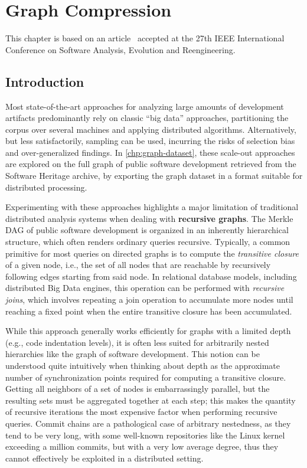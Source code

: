 \chapter{Graph Compression}%
\label{chp:graph-compression}

This chapter is based on an article~\cite{saner-2020-swh-graph} accepted at the
27th IEEE International Conference on Software Analysis, Evolution and
Reengineering.

\section{Introduction}%
\label{sec:compression-intro}

Most state-of-the-art approaches for analyzing large amounts of development
artifacts predominantly rely on classic ``big data'' approaches, partitioning the
corpus over several machines and applying distributed algorithms.
Alternatively, but less satisfactorily, sampling can be used, incurring the
risks of selection bias and over-generalized findings.
In \cref{chp:graph-dataset}, these scale-out approaches are explored on
the full graph of public software development retrieved from the Software
Heritage archive, by exporting the graph dataset in a format suitable for
distributed processing.

Experimenting with these approaches highlights a major limitation of
traditional distributed analysis systems when dealing with \textbf{recursive
graphs}. The Merkle \gls{DAG} of public software development is organized in an
inherently hierarchical structure, which often renders ordinary queries
recursive.
Typically, a common primitive for most queries on directed graphs is to
compute the \emph{transitive closure} of a given node, i.e., the set of all
nodes that are reachable by recursively following edges starting from said
node. In relational database models, including distributed Big Data engines,
this operation can be performed with \emph{recursive joins}, which involves
repeating a join operation to accumulate more nodes until reaching a fixed
point when the entire transitive closure has been accumulated.

While this approach generally works efficiently for graphs with a limited depth
(e.g., code indentation levels), it is often less suited for arbitrarily nested
hierarchies like the graph of software development.
This notion can be understood quite intuitively when thinking about depth as
the approximate number of synchronization points required for computing a
transitive closure. Getting all neighbors of a set of nodes is
embarrassingly parallel, but the resulting sets must be aggregated together at
each step; this makes the quantity of recursive iterations the most expensive
factor when performing recursive queries.
Commit chains are a pathological case of arbitrary nestedness, as they tend to
be very long, with some well-known repositories like the Linux kernel exceeding
a million commits, but with a very low average degree, thus they cannot
effectively be exploited in a distributed setting.

